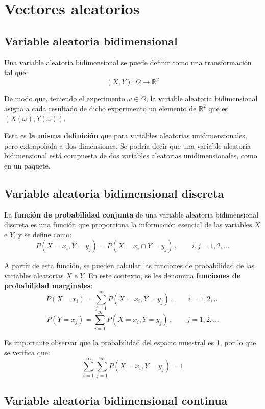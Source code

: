 \documentclass[a4paper]{book}
\begin{document}
\chapter{Vectores aleatorios}
\section{Variable aleatoria bidimensional}

Una variable aleatoria bidimensional se puede definir como una transformación tal que:
\[\left( X,Y \right) : \Omega \longrightarrow \mathbb{R}^2\]

De modo que, teniendo el experimento $\omega \in \Omega$, la variable aleatoria bidimensional asigna a cada resultado de dicho experimento un elemento de $\mathbb{R}^2$ que es $\left( X(\omega ),Y(\omega )\right)$.

Esta es \textbf{la misma definición} que para variables aleatorias unidimensionales, pero extrapolada a dos dimensiones. Se podría decir que una variable aleatoria bidimensional está compuesta de dos variables aleatorias unidimensionales, como en un paquete.

\section{Variable aleatoria bidimensional discreta}

La \textbf{función de probabilidad conjunta} de una variable aleatoria bidimensional discreta es una función que proporciona la información esencial de las variables $X$ e $Y$, y se define como:
\[P\left( X=x_i,Y=y_j \right) = P\left( X=x_i \cap Y=y_j \right) \, , \qquad i, j = 1, 2, \dots \]

A partir de esta función, se pueden calcular las funciones de probabilidad de las variables aleatorias $X$ e $Y$. En este contexto, se les denomina \textbf{funciones de probabilidad marginales}:
\[ P\left( X=x_i \right) = \sum_{j=1}^{\infty} P\left( X=x_i, Y=y_j \right) \, , \qquad i = 1, 2, \dots \]
\[ P\left( Y=x_j \right) = \sum_{i=1}^{\infty} P\left( X=x_i, Y=y_j \right) \, , \qquad j = 1, 2, \dots \]

Es importante observar que la probabilidad del espacio muestral es 1, por lo que se verifica que:
\[ \sum_{i=1}^{\infty}\sum_{j=1}^{\infty} P\left( X=x_i, Y=y_j \right) = 1 \]

\section{Variable aleatoria bidimensional continua}
\end{document}
